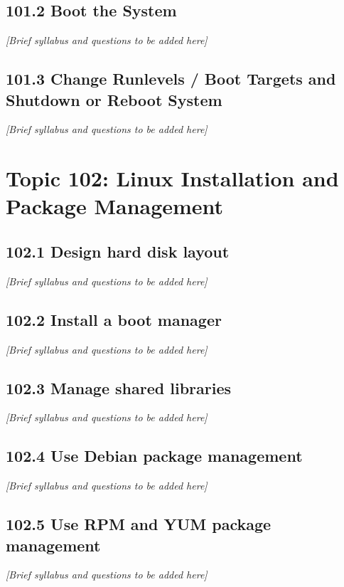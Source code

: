 \documentclass[12pt,a4paper]{report}
\begin{document}

\section{101.2 Boot the System}
\textit{[Brief syllabus and questions to be added here]}

\section{101.3 Change Runlevels / Boot Targets and Shutdown or Reboot System}
\textit{[Brief syllabus and questions to be added here]}

\chapter{Topic 102: Linux Installation and Package Management}
\section{102.1 Design hard disk layout}
\textit{[Brief syllabus and questions to be added here]}

\section{102.2 Install a boot manager}
\textit{[Brief syllabus and questions to be added here]}

\section{102.3 Manage shared libraries}
\textit{[Brief syllabus and questions to be added here]}

\section{102.4 Use Debian package management}
\textit{[Brief syllabus and questions to be added here]}

\section{102.5 Use RPM and YUM package management}
\textit{[Brief syllabus and questions to be added here]}
\end{document}
